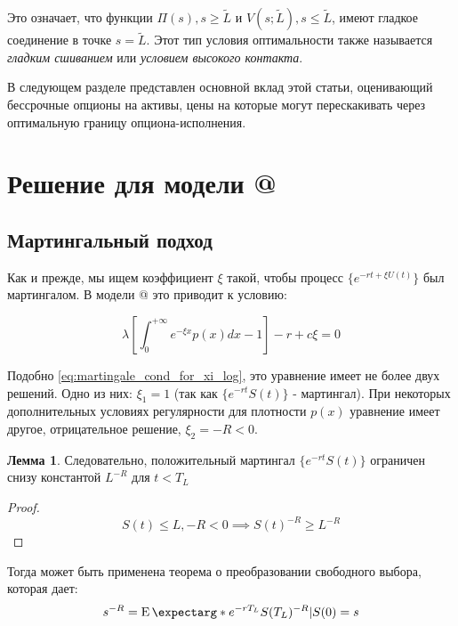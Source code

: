 \documentclass[a4paper,12pt]{article}
\makeatletter
\theoremstyle{definition}
\newtheorem{lemma}{Лемма}
\newcommand*{\rom}[1]{\expandafter\@slowromancap\romannumeral #1@}
\newcommand{\expect}{\operatorname{E}\expectarg}
\makeatother
\begin{document}
Это означает, что функции $\Pi(s), s \ge \widetilde{L}$ и $V(s; \widetilde{L}), s \le \widetilde{L}$, имеют гладкое соединение в точке $s = \widetilde{L}$. Этот тип условия оптимальности также называется \textit{гладким сшиванием} или \textit{условием высокого контакта}.

В следующем разделе представлен основной вклад этой статьи, оценивающий бессрочные опционы на активы, цены на которые могут перескакивать через оптимальную границу опциона-исполнения.

\section{Решение для модели \rom{2}}

\subsection{Мартингальный подход}

Как и прежде, мы ищем коэффициент $\xi$ такой, чтобы
процесс $\{e^{-rt + \xi U(t)}\}$ был мартингалом. В модели \rom{2} это
приводит к условию:

\begin{equation}
    \lambda \left[ \int_{0}^{+\infty} e^{-\xi x} p(x) dx - 1 \right] - r + c \xi = 0
\end{equation}

Подобно \eqref{eq:martingale_cond_for_xi_log}, это уравнение имеет не более двух решений. Одно из них: $\xi_1 = 1$ (так как $\{e^{-rt} S(t)\}$ - мартингал).
При некоторых дополнительных условиях регулярности для плотности $p(x)$ уравнение имеет другое, отрицательное решение, $\xi_2 = -R < 0$.

\begin{lemma}
Следовательно, положительный мартингал  $\{e^{-rt} S(t)\}$ ограничен снизу константой $L^{-R}$ для $t < T_L$
\end{lemma}
\begin{proof}
\begin{equation*}
    S(t) \le L, -R < 0 \implies S(t)^{-R} \ge L ^{-R}
\end{equation*}
\end{proof}

Тогда может быть применена теорема о преобразовании свободного выбора, которая дает:
\begin{equation*}
    s^{-R} = \expect*{e^{-rT_L} S(T_L)^{-R} | S(0) = s}
\end{equation*}
\end{document}
